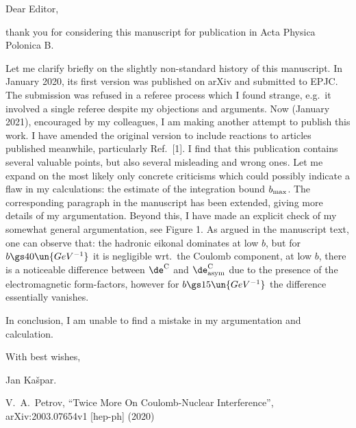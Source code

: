 

\parskip5mm
\parindent5mm

\itskip-3mm

\let\linkColor\cBlue

Dear Editor,

thank you for considering this manuscript for publication in Acta Physica Polonica B.

Let me clarify briefly on the slightly non-standard history of this manuscript. In January 2020, its first version was published on arXiv and submitted to EPJC. The submission was refused in a referee process which I found strange, e.g.~it involved a single referee despite my objections and arguments. Now (January 2021), encouraged by my colleagues, I am making another attempt to publish this work. I have amended the original version to include reactions to articles published meanwhile, particularly Ref.~[1]. I find that this publication contains several valuable points, but also several misleading and wrong ones. Let me expand on the most likely only concrete criticisms which could possibly indicate a flaw in my calculations: the estimate of the integration bound $b_{\rm max}$. The corresponding paragraph in the manuscript has been extended, giving more details of my argumentation. Beyond this, I have made an explicit check of my somewhat general argumentation, see Figure 1. As argued in the manuscript text, one can observe that:
\> the hadronic eikonal dominates at low $b$, but for $b \gs 40\un{GeV^{-1}}$ it is negligible wrt.~the Coulomb component,
\> at low $b$, there is a noticeable difference between $\de^{\rm C}$ and $\de^{\rm C}_{\rm asym}$ due to the presence of the electromagnetic form-factors, however for $b \gs 15\un{GeV^{-1}}$ the difference essentially vanishes.

\vskip-3mm
\noindent In conclusion, I am unable to find a mistake in my argumentation and calculation.

With best wishes,

Jan Ka\v spar.



\noindent [1] V.~A.~Petrov, ``Twice More On Coulomb-Nuclear Interference'', arXiv:2003.07654v1 [hep-ph] (2020)

\bye
